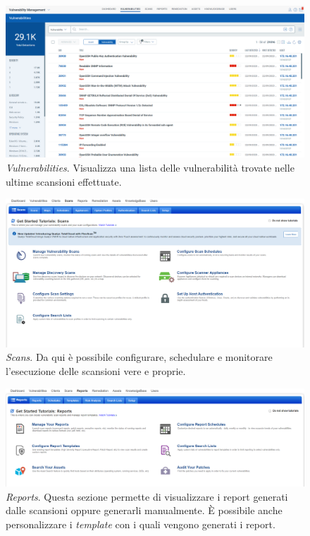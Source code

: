 \documentclass[target=bach,aauheader=]{thud}
\begin{document}
\begin{figure}
\centering
\includegraphics[scale=0.329]{images/qualys_vuln.png}
    \caption{\textit{Vulnerabilities}. Visualizza una lista delle vulnerabilità trovate nelle ultime scansioni effettuate.}
\end{figure}

\begin{figure}
\centering
\includegraphics[scale=0.329]{images/qualys_scans.png}
    \caption{\textit{Scans}. Da qui è possibile configurare, schedulare e monitorare l'esecuzione delle scansioni vere e proprie.}
\end{figure}

\begin{figure}
\centering
\includegraphics[scale=0.329]{images/qualys_reports.png}
    \caption{\textit{Reports}. Questa sezione permette di visualizzare i report generati dalle scansioni oppure generarli manualmente. È possibile anche personalizzare i \textit{template} con i quali vengono generati i report.}
\end{figure}
\end{document}
